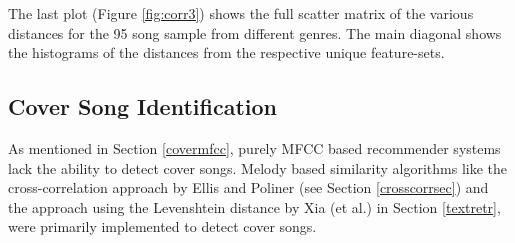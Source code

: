 \noindent The last plot (Figure \ref{fig:corr3}) shows the full scatter matrix of the various distances for the 95 song sample from different genres. The main diagonal shows the histograms of the distances from the respective unique feature-sets.

\begin{figure}[htbp]
	\centering
\end{figure}
\FloatBarrier


\subsection{Cover Song Identification}\label{covsongid}

As mentioned in Section \ref{covermfcc}, purely MFCC based recommender systems lack the ability to detect cover songs. Melody based similarity algorithms like the cross-correlation approach by Ellis and Poliner (see Section \ref{crosscorrsec}) and the approach using the Levenshtein distance by Xia (et al.) in Section \ref{textretr}, were primarily implemented to detect cover songs. 


